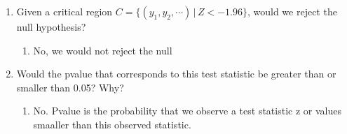 \documentclass[krantz1,ChapterTOCs]{krantz}
\begin{document}
\begin{enumerate}
\begin{enumerate}
\begin{enumerate}
{            }
        \end{enumerate}
    
        
        \item Given a critical region $C = \{ (y_{1},y_{2}, \cdots ) \, | \, Z < -1.96 \}$, would we reject the null hypothesis?
        
        \begin{enumerate}
            \item {\color{red} No, we would not reject the null }
        \end{enumerate}
    
        
        \item Would the pvalue that corresponds to this test statistic be greater than or smaller than 0.05? Why?
        \begin{enumerate}
            \item {\color{red} No. Pvalue is the probability that we observe a test statistic z or values smaaller than this observed statistic.  }
        \end{enumerate}
    
        
    \end{enumerate}
    

\end{enumerate}
\end{document}
